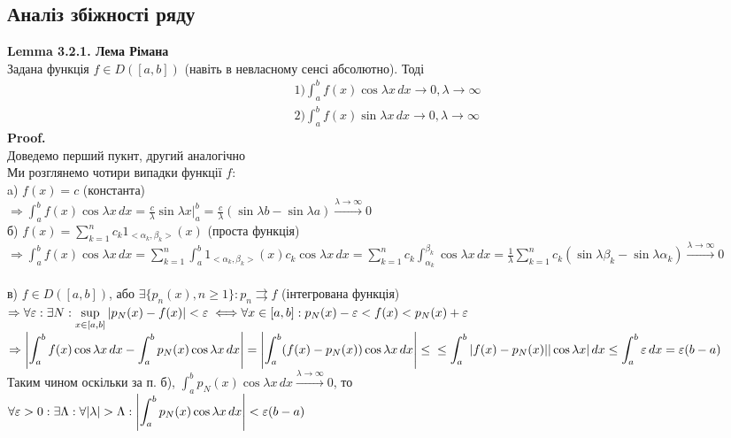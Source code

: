 \documentclass[a4paper, 14pt]{extarticle}
\def\hugespace{\vspace{5mm} \\}
\begin{document}
\subsection{Аналіз збіжності ряду}
\textbf{Lemma 3.2.1. Лема Рімана}\\ Задана функція $f \in D([a,b])$ (навіть в невласному сенсі абсолютно). Тоді
\begin{align*}
1) \int_a^b f(x) \cos \lambda x \,dx \to 0, \lambda \to \infty \\
2) \int_a^b f(x) \sin \lambda x \,dx \to 0, \lambda \to \infty
\end{align*}
\textbf{Proof.}\\
Доведемо перший пукнт, другий аналогічно\\
Ми розглянемо чотири випадки функції $f$:\\
a) $f(x) = c$ (константа)\\
 $\Rightarrow \displaystyle \int_a^b f(x) \cos \lambda x \,dx = \frac{c}{\lambda} \sin \lambda x \Big|_{a}^b = \frac{c}{\lambda} \left(\sin \lambda b - \sin \lambda a \right) \overset{\lambda \to \infty}{\to} 0$
\hugespace
б) $\displaystyle f(x) = \sum_{k=1}^n c_k 1_{<\alpha_k, \beta_k>} (x)$ (проста функція)\\
$\Rightarrow \displaystyle \int_a^b f(x) \cos \lambda x \,dx = \sum_{k=1}^n \int_a^b 1_{<\alpha_k, \beta_k>} (x) c_k \cos \lambda x \,dx = \sum_{k=1}^n c_k \int_{\alpha_k}^{\beta_k} \cos \lambda x \,dx = \frac{1}{\lambda} \sum_{k=1}^n c_k (\sin \lambda \beta_k - \sin \lambda \alpha_k) \overset{\lambda \to \infty}{\to} 0$\\
\hugespace
в) $f \in D([a,b])$, або $\exists \{p_n(x), n \geq 1\}: p_n \rightrightarrows f$ (інтегрована функція)\\
$\Rightarrow \displaystyle \forall \varepsilon: \exists N: \sup_{x \in [a,b]} |p_N(x) - f(x)| < \varepsilon \iff \\ \forall x \in [a,b]: p_N(x) - \varepsilon <f(x) < p_N(x) + \varepsilon$\\
$\Rightarrow \displaystyle \abs{\int_a^b f(x) \cos \lambda x \,dx - \int_a^b p_N(x) \cos \lambda x \,dx} = \abs{\int_a^b (f(x) - p_N(x)) \cos \lambda x \,dx} \leq \\ \leq \int_a^b |f(x)-p_N(x)| |\cos \lambda x| \,dx \leq \int_a^b \varepsilon \,dx = \varepsilon(b-a)$\\
Таким чином оскільки за п. б), $\displaystyle \int_a^b p_N(x) \cos \lambda x \,dx \overset{\lambda \to \infty}{\to} 0$, то\\
$\displaystyle \forall \varepsilon>0: \exists \Lambda: \forall |\lambda| > \Lambda: \abs{\int_a^b p_N(x) \cos \lambda x \,dx} < \varepsilon(b-a)$\\
\end{document}
